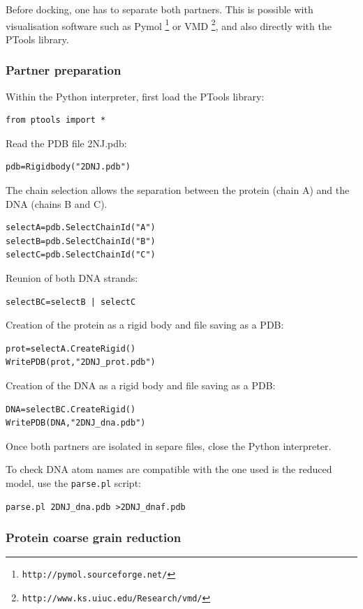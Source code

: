 \documentclass[12pt,a4paper]{article}
\begin{document}
Before docking, one has to separate both partners. This is possible with visualisation
software such as Pymol \footnote{\tt http://pymol.sourceforge.net/} or VMD \footnote{\tt http://www.ks.uiuc.edu/Research/vmd/}, and also directly with the PTools library.

\subsubsection{Partner preparation}

Within the Python interpreter, first load the PTools library:
\begin{verbatim}
from ptools import *
\end{verbatim}

Read the PDB file 2NJ.pdb:
\begin{verbatim}
pdb=Rigidbody("2DNJ.pdb")
\end{verbatim}

The chain selection allows the separation between the protein (chain A) and the DNA (chains B and C).
\begin{verbatim}
selectA=pdb.SelectChainId("A")
selectB=pdb.SelectChainId("B")
selectC=pdb.SelectChainId("C")
\end{verbatim}

Reunion of both DNA strands:
\begin{verbatim}
selectBC=selectB | selectC
\end{verbatim}

Creation of the protein as a rigid body and file saving as a PDB:
\begin{verbatim}
prot=selectA.CreateRigid()
WritePDB(prot,"2DNJ_prot.pdb")
\end{verbatim}

Creation of the DNA as a rigid body and file saving as a PDB:
\begin{verbatim}
DNA=selectBC.CreateRigid()
WritePDB(DNA,"2DNJ_dna.pdb")
\end{verbatim}

Once both partners are isolated in separe files, close the Python interpreter.

To check DNA atom names are compatible with the one used is the reduced model, use the {\tt parse.pl} script:
\begin{verbatim}
parse.pl 2DNJ_dna.pdb >2DNJ_dnaf.pdb
\end{verbatim}

\subsubsection{Protein coarse grain reduction}
\end{document}
